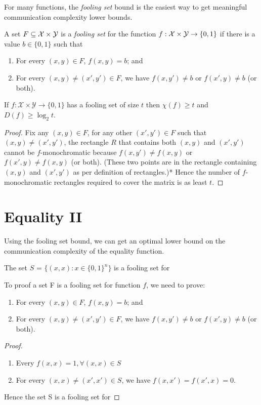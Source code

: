 For many functions, the \emph{fooling set} bound is the easiest way to get meaningful communication complexity lower bounds.

\begin{definition}
A set $F \subseteq \mathcal{X} \times \mathcal{Y}$ is a \emph{fooling set} for the function $f : \mathcal{X} \times \mathcal{Y} \to \{0,1\}$ if there is a value $b \in \{0,1\}$ such that
\begin{enumerate}
\item For every $(x,y) \in F$, $f(x,y) = b$; and
\item For every $(x,y) \neq (x',y') \in F$, we have $f(x,y') \neq b$ or $f(x',y) \neq b$ (or both).
\end{enumerate}
\end{definition}

\begin{lemma}
If $f : \mathcal{X} \times \mathcal{Y} \to \{0,1\}$ has a fooling set of size $t$ then $\chi(f) \ge t$ and $D(f) \ge \log_2 t$.
\end{lemma}

\begin{proof}
Fix any $(x, y) \in F$, for any other $(x',y') \in F$ such that $(x,y) \neq (x',y')$, the rectangle $R$ that contains both $(x,y)$ and $(x',y')$ cannot be $f$-monochromatic because $f(x,y') \neq f(x, y)$ or $f(x',y) \neq f(x,y)$ (or both). (These two points are in the rectangle containing $(x,y)$ and $(x',y')$ as per definition of rectangles.)* Hence the number of $f$-monochromatic rectangles required to cover the matrix is as least $t$. 
\end{proof}


\newpage \section{Equality II}

Using the fooling set bound, we can get an optimal lower bound on the communication complexity of the equality function.

\begin{claim}
The set $S$ = $\{(x, x): x \in \{0, 1\}^n \}$ is a fooling set for \Eq
\end{claim}

To proof a set F is a fooling set for function $f$, we need to prove:
\begin{enumerate}
\item For every $(x,y) \in F$, $f(x,y) = b$; and
\item For every $(x,y)≠(x′,y′)∈F$, we have $f(x,y′)≠b$ or $f(x′,y)≠b$ (or both).
\end{enumerate}
\begin{proof}
\begin{enumerate}
\item Every $f(x,x) = 1, \forall (x, x) \in S$ 
\item For every $(x,x)≠(x′,x′) \in S$, we have $f(x,x′) = f(x′,x) = 0$.
\end{enumerate}
Hence the set S is a fooling set for \Eq
\end{proof}

